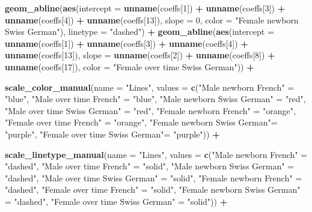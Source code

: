 \documentclass[
]{book}
\newenvironment{Shaded}{\begin{snugshade}}{\end{snugshade}}
\newcommand{\AttributeTok}[1]{\textcolor[rgb]{0.13,0.29,0.53}{#1}}
\newcommand{\DecValTok}[1]{\textcolor[rgb]{0.00,0.00,0.81}{#1}}
\newcommand{\FunctionTok}[1]{\textcolor[rgb]{0.13,0.29,0.53}{\textbf{#1}}}
\newcommand{\NormalTok}[1]{#1}
\newcommand{\OtherTok}[1]{\textcolor[rgb]{0.56,0.35,0.01}{#1}}
\newcommand{\SpecialCharTok}[1]{\textcolor[rgb]{0.81,0.36,0.00}{\textbf{#1}}}
\newcommand{\StringTok}[1]{\textcolor[rgb]{0.31,0.60,0.02}{#1}}
\begin{document}
\begin{Shaded}
\begin{Highlighting}[]
  \FunctionTok{geom\_abline}\NormalTok{(}\FunctionTok{aes}\NormalTok{(}\AttributeTok{intercept =} \FunctionTok{unname}\NormalTok{(coeffs[}\DecValTok{1}\NormalTok{]) }\SpecialCharTok{+} \FunctionTok{unname}\NormalTok{(coeffs[}\DecValTok{3}\NormalTok{]) }\SpecialCharTok{+} \FunctionTok{unname}\NormalTok{(coeffs[}\DecValTok{4}\NormalTok{]) }\SpecialCharTok{+} \FunctionTok{unname}\NormalTok{(coeffs[}\DecValTok{13}\NormalTok{]),}
                  \AttributeTok{slope =} \DecValTok{0}\NormalTok{, }\AttributeTok{color =} \StringTok{"Female newborn Swiss German"}\NormalTok{), }\AttributeTok{linetype =} \StringTok{"dashed"}\NormalTok{) }\SpecialCharTok{+}
  \FunctionTok{geom\_abline}\NormalTok{(}\FunctionTok{aes}\NormalTok{(}\AttributeTok{intercept =} \FunctionTok{unname}\NormalTok{(coeffs[}\DecValTok{1}\NormalTok{]) }\SpecialCharTok{+} \FunctionTok{unname}\NormalTok{(coeffs[}\DecValTok{3}\NormalTok{]) }\SpecialCharTok{+} \FunctionTok{unname}\NormalTok{(coeffs[}\DecValTok{4}\NormalTok{]) }\SpecialCharTok{+} \FunctionTok{unname}\NormalTok{(coeffs[}\DecValTok{13}\NormalTok{]),}
                  \AttributeTok{slope =} \FunctionTok{unname}\NormalTok{(coeffs[}\DecValTok{2}\NormalTok{]) }\SpecialCharTok{+} \FunctionTok{unname}\NormalTok{(coeffs[}\DecValTok{8}\NormalTok{]) }\SpecialCharTok{+} \FunctionTok{unname}\NormalTok{(coeffs[}\DecValTok{17}\NormalTok{]), }\AttributeTok{color =} \StringTok{"Female over time Swiss German"}\NormalTok{)) }\SpecialCharTok{+}
  
  \FunctionTok{scale\_color\_manual}\NormalTok{(}\AttributeTok{name =} \StringTok{"Lines"}\NormalTok{, }\AttributeTok{values =} \FunctionTok{c}\NormalTok{(}\StringTok{"Male newborn French"} \OtherTok{=} \StringTok{"blue"}\NormalTok{, }\StringTok{"Male over time French"} \OtherTok{=} \StringTok{"blue"}\NormalTok{, }\StringTok{"Male newborn Swiss German"} \OtherTok{=} \StringTok{"red"}\NormalTok{, }\StringTok{"Male over time Swiss German"} \OtherTok{=} \StringTok{"red"}\NormalTok{, }\StringTok{"Female newborn French"} \OtherTok{=} \StringTok{"orange"}\NormalTok{, }\StringTok{"Female over time French"} \OtherTok{=} \StringTok{"orange"}\NormalTok{, }\StringTok{"Female newborn Swiss German"}\OtherTok{=} \StringTok{"purple"}\NormalTok{, }\StringTok{"Female over time Swiss German"}\OtherTok{=} \StringTok{"purple"}\NormalTok{)) }\SpecialCharTok{+}

  \FunctionTok{scale\_linetype\_manual}\NormalTok{(}\AttributeTok{name =} \StringTok{"Lines"}\NormalTok{, }\AttributeTok{values =} \FunctionTok{c}\NormalTok{(}\StringTok{"Male newborn French"} \OtherTok{=} \StringTok{"dashed"}\NormalTok{, }\StringTok{"Male over time French"} \OtherTok{=} \StringTok{"solid"}\NormalTok{, }\StringTok{"Male newborn Swiss German"} \OtherTok{=} \StringTok{"dashed"}\NormalTok{, }\StringTok{"Male over time Swiss German"} \OtherTok{=} \StringTok{"solid"}\NormalTok{, }\StringTok{"Female newborn French"} \OtherTok{=} \StringTok{"dashed"}\NormalTok{, }\StringTok{"Female over time French"} \OtherTok{=} \StringTok{"solid"}\NormalTok{, }\StringTok{"Female newborn Swiss German"} \OtherTok{=} \StringTok{"dashed"}\NormalTok{, }\StringTok{"Female over time Swiss German"} \OtherTok{=} \StringTok{"solid"}\NormalTok{)) }\SpecialCharTok{+}


\end{Highlighting}
\end{Shaded}
\end{document}
